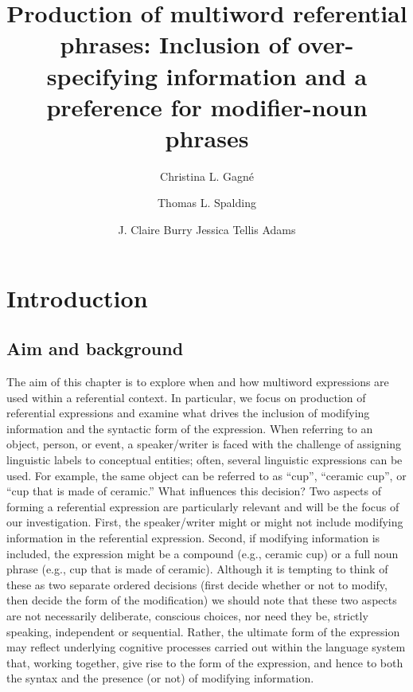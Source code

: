 \documentclass[output=paper]{langsci/langscibook}
\title{Production of multiword referential phrases: Inclusion of
  over-specifying information and a preference for modifier-noun
  phrases}
\author{%
  Christina L. Gagné\affiliation{Department of Psychology, University of Alberta}\and
  Thomas L. Spalding\affiliation{Department of Psychology, University of Alberta}\and
  J. Claire Burry\affiliation{Department of Psychology, University of Alberta}\lastand
  Jessica Tellis Adams\affiliation{KidsAbility Centre for Child Development, Ontario}
}
\begin{document}
\maketitle


\section{Introduction}

\subsection{Aim and background}

The aim of this chapter is to explore when and how multiword
expressions are used within a referential context. In particular, we
focus on production of referential expressions and examine what drives
the inclusion of modifying information and the syntactic form of the
expression. When referring to an object, person, or event, a
speaker/writer is faced with the challenge of assigning linguistic
labels to conceptual entities; often, several linguistic expressions
can be used. For example, the same object can be referred to as “cup”,
“ceramic cup”, or “cup that is made of ceramic.” What influences this
decision? Two aspects of forming a referential expression are
particularly relevant and will be the focus of our
investigation. First, the speaker/writer might or might not include
modifying information in the referential expression. Second, if
modifying information is included, the expression might be a compound
(e.g., ceramic cup) or a full noun phrase (e.g., cup that is made of
ceramic). Although it is tempting to think of these as two separate
ordered decisions (first decide whether or not to modify, then decide
the form of the modification) we should note that these two aspects
are not necessarily deliberate, conscious choices, nor need they be,
strictly speaking, independent or sequential. Rather, the ultimate
form of the expression may reflect underlying cognitive processes
carried out within the language system that, working together, give
rise to the form of the expression, and hence to both the syntax and
the presence (or not) of modifying information.
\end{document}
